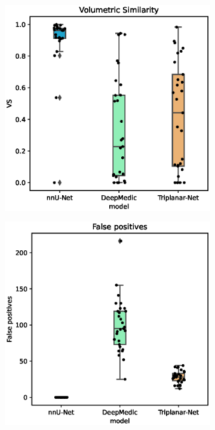 \begin{figure}
	\ContinuedFloat
	\centering
	\begin{subfigure}{.6\linewidth}
		\includegraphics[width=\linewidth]{figures/VS.eps}
	\end{subfigure}
	\begin{subfigure}{.6\linewidth}
		\includegraphics[width=\linewidth]{figures/FalsePositives.eps}
	\end{subfigure}
	\caption[]{}
	\label{fig:results_cont}
\end{figure}
